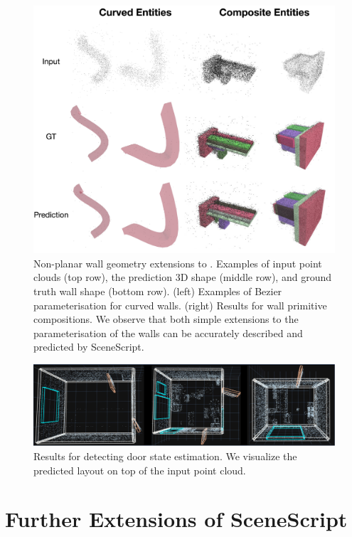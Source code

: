 \begin{figure}[t]
    \centering
    \includegraphics[width=\columnwidth]{figs/fuyang}
    \caption{Non-planar wall geometry extensions to \METHOD. Examples of input point clouds (top row), the prediction 3D shape (middle row),
and ground truth wall shape (bottom row). (left) Examples of Bezier parameterisation for curved walls. (right) Results for wall primitive compositions. We observe that both simple extensions to the parameterisation of the walls can be accurately described and predicted by SceneScript.}
    \label{fig:ext_fuyang}
\end{figure}
\begin{figure}[ht]
    \centering
    \includegraphics[width=0.9\columnwidth]{figs/door_state.pdf}
    \caption{Results for detecting door state estimation. We visualize the predicted layout on top of the input point cloud.}
    \label{fig:ext_door_state}
\end{figure}

\section{Further Extensions of SceneScript}
\label{app:extensions}
